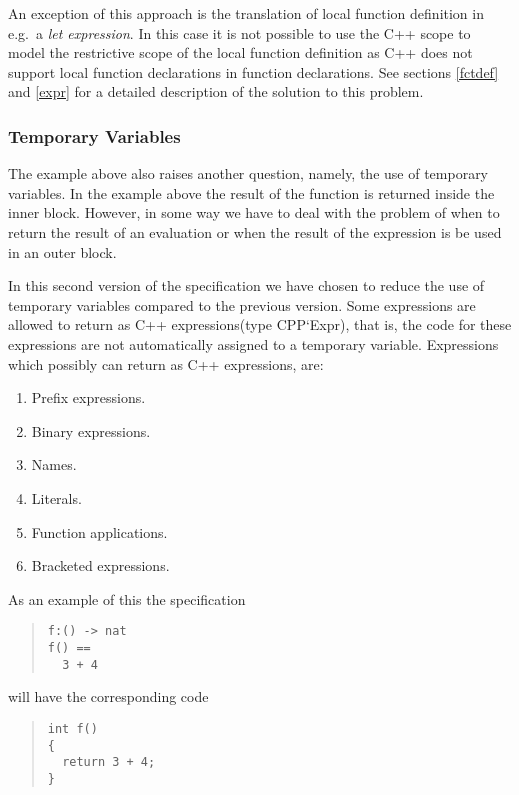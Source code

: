 \documentclass[a4paper,dvips]{article}
\begin{document}
An exception of this approach is the translation of local function
definition in e.g.\ a {\em let expression}. In this case it is not
possible to use the C++ scope to model the restrictive scope of the
local function definition as C++ does not support local function
declarations in function declarations. See sections \ref{fctdef} and
\ref{expr} for a detailed description of the solution to this problem.


\subsubsection{Temporary Variables}
\label{tmpvar:sec}

The example above also raises another question, namely, the use of
temporary variables. In the example above the result of the function
is returned inside the inner block. However, in some way we have to
deal with the problem of when to return the result of an evaluation or
when the result of the expression is be used in an outer block.

In this second version of the specification we have chosen to reduce
the use of temporary variables compared to the previous version.  Some
expressions are allowed to return as C++ expressions(type CPP`Expr),
that is, the code for these expressions are not automatically assigned
to a temporary variable. Expressions which possibly can return as C++
expressions, are:

\begin{enumerate}
\item Prefix expressions.
\item Binary expressions.
\item Names.
\item Literals.
\item Function applications.
\item Bracketed expressions.
\end{enumerate}

As an example of this the specification

\begin{quote}
\begin{verbatim}
f:() -> nat
f() ==
  3 + 4
\end{verbatim}
\end{quote}

will have the corresponding code 
\begin{quote}
\begin{verbatim}
int f()
{
  return 3 + 4;
}
\end{verbatim}
\end{quote}
\end{document}
